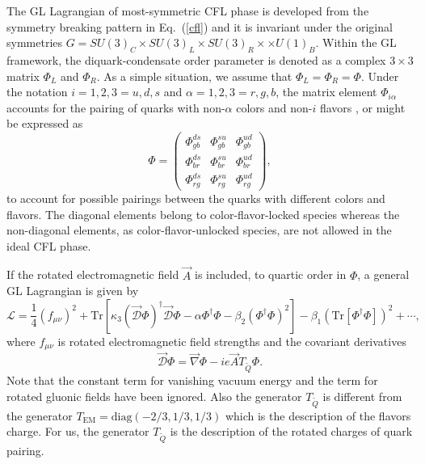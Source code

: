 \documentclass[12pt]{article}
\begin{document}
The GL Lagrangian of most-symmetric CFL phase is developed from the symmetry breaking pattern in Eq.~(\ref{cfl}) and it is invariant
under the original symmetries $G=SU(3)_C \times SU(3)_L\times SU(3)_R\times\times U(1)_B$. Within the GL framework, the
diquark-condensate order parameter is denoted as a complex $3\times3$ matrix $\Phi_L$ and $\Phi_R$.
As a simple situation, we assume that $\Phi_L = \Phi_R = \Phi$.
Under the notation
$i = 1, 2, 3 = u, d, s$ and $\alpha = 1, 2, 3 = r, g, b$, the matrix element $\Phi_{i \alpha}$ accounts
for the pairing of quarks with non-$\alpha$ colors and non-$i$ flavors \cite{iida2002superfluid}, or might be expressed  as
\begin{equation}
  \label{eq:diquarkmatrix}
  \Phi =
  \begin{pmatrix}
    \Phi_{gb}^{ds} &  \Phi_{gb}^{su} & \Phi_{gb}^{ud} \\
    \Phi_{br}^{ds} &  \Phi_{br}^{su} & \Phi_{br}^{ud} \\
    \Phi_{rg}^{ds} &  \Phi_{rg}^{su} & \Phi_{rg}^{ud}
  \end{pmatrix},
\end{equation}
to account for possible pairings between the quarks with different colors and flavors.
The diagonal elements belong to color-flavor-locked species whereas the non-diagonal elements, as
color-flavor-unlocked species, are not allowed in the ideal CFL phase.


If the rotated electromagnetic field $\vec{A}$ is included,
to quartic order in $\Phi$,  a general GL Lagrangian 
is given by
\begin{equation}
\mathcal{L}= \frac{1}{4} (f_{\mu\nu})^2 +
\text{Tr}\left[\kappa_3(\vec{\mathcal{D}}\Phi)^\dagger\vec{\mathcal{D}}\Phi
  -\alpha\Phi^\dagger\Phi -\beta_2(\Phi^\dagger\Phi)^2\right]
-\beta_1(\text{Tr}[\Phi^\dagger\Phi])^2 +\cdots ,\label{gl}
\end{equation}
where $f_{\mu\nu}$ is rotated electromagnetic field strengths and the covariant derivatives 
\begin{equation}
\vec{\mathcal{D}}\Phi =\vec{\nabla} \Phi -ie\vec{A} T_{\widetilde{Q}}\Phi.
\end{equation}
Note that the constant term for vanishing vacuum energy and the term for rotated gluonic fields have been
ignored. Also the generator $T_{\widetilde{Q}}$ is different from the generator $T_{\text{EM}} =  \text{diag}(-2/3,1/3,1/3)$ which
is the description of the flavors charge. For us, the generator $T_{\widetilde{Q}}$ is the 
description of the rotated charges of quark pairing. 
\end{document}
